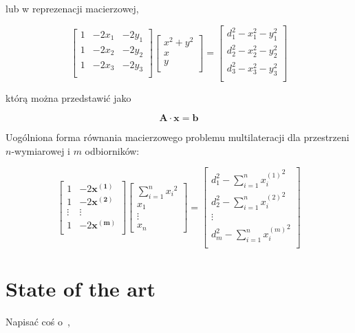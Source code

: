 lub w reprezenacji macierzowej,

\begin{equation}
    \left[
        \begin{matrix}
            1 & -2x_1 & -2y_1\\
            1 & -2x_2 & -2y_2\\
            1 & -2x_3 & -2y_3\\
        \end{matrix}
    \right]
    \left[
        \begin{matrix}
            x^2 + y^2\\
            x\\
            y\\
        \end{matrix}
    \right]
    =
    \left[
        \begin{matrix}
            d_1^2 - x_1^2 - y_1^2\\
            d_2^2 - x_2^2 - y_2^2\\
            d_3^2 - x_3^2 - y_3^2\\
        \end{matrix}
    \right]
\end{equation}

którą można przedstawić jako

\begin{equation}
    \boldsymbol{A} \cdot \boldsymbol{x} = \boldsymbol{b}
\end{equation}

Uogólniona forma równania macierzowego problemu multilateracji dla przestrzeni $n$-wymiarowej i $m$ odbiorników:

\begin{equation}
    \left[
        \begin{matrix}
            1 & -2\boldsymbol{x^{(1)}}\\
            1 & -2\boldsymbol{x^{(2)}}\\
            \vdots & \vdots\\
            1 & -2\boldsymbol{x^{(m)}}\\
        \end{matrix}
    \right]
    \left[
        \begin{matrix}
            \sum_{i=1}^{n}{x_i}^2\\
            x_1\\
            \vdots\\
            x_n
        \end{matrix}
    \right]
    =
    \left[
        \begin{matrix}
            d_1^2 - \sum_{i=1}^{n}{x_i^{(1)}}^2\\
            d_2^2 - \sum_{i=1}^{n}{x_i^{(2)}}^2\\
            \vdots\\
            d_m^2 - \sum_{i=1}^{n}{x_i^{(m)}}^2\\
        \end{matrix}
    \right]
\end{equation}


\section{State of the art}

Napisać coś o~\cite{murphy1995determination},\cite{norrdine2012algebraic}
